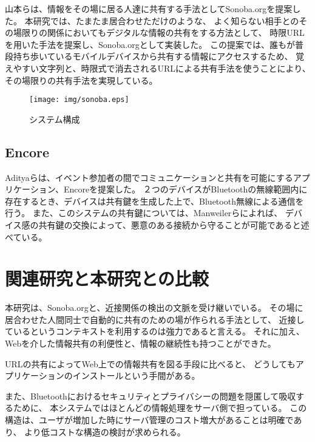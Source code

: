 山本らは、情報をその場に居る人達に共有する手法としてSonoba.org\cite{山本伶:2013-03-06}を提案した。
本研究では、たまたま居合わせただけのような、
よく知らない相手とのその場限りの関係においてもデジタルな情報の共有をする方法として、
時限URLを用いた手法を提案し、Sonoba.orgとして実装した。
この提案では、誰もが普段持ち歩いているモバイルデバイスから共有する情報にアクセスするため、
覚えやすい文字列と、時限式で消去されるURLによる共有手法を使うことにより、その場限りの共有手法を実現している。

\begin{figure}[h]
  \begin{center}
    \texttt{[image: img/sonoba.eps]}
  \end{center}
  \caption{システム構成}
  \label{fig:sonoba}
\end{figure}

\subsection{Encore}

Adityaらは、イベント参加者の間でコミュニケーションと共有を可能にするアプリケーション、Encoreを提案した。\cite{Aditya:2014:EPC:2594368.2594374}
２つのデバイスがBluetoothの無線範囲内に存在するとき、デバイスは共有鍵を生成した上で、Bluetooth無線による通信を行う。
また、このシステムの共有鍵については、Manweilerら\cite{Manweiler:2009:SET:1653662.1653692}によれば、
デバイス感の共有鍵の交換によって、悪意のある接続から守ることが可能であると述べている。



\section{関連研究と本研究との比較}

本研究は、Sonoba.org\cite{山本伶:2013-03-06}と、近接関係の検出の文脈を受け継いでいる。
その場に居合わせた人間同士で自動的に共有のための場が作られる手法として、
近接しているというコンテキストを利用するのは強力であると言える。
それに加え、Webを介した情報共有の利便性と、情報の継続性も持つことができた。

URLの共有によってWeb上での情報共有を図る手段に比べると、
どうしてもアプリケーションのインストールという手間がある。

また、Bluetoothにおけるセキュリティとプライバシーの問題を隠匿して吸収するために、
本システムではほとんどの情報処理をサーバ側で担っている。
この構造は、ユーザが増加した時にサーバ管理のコスト増大があることは明確であり、
より低コストな構造の検討が求められる。
